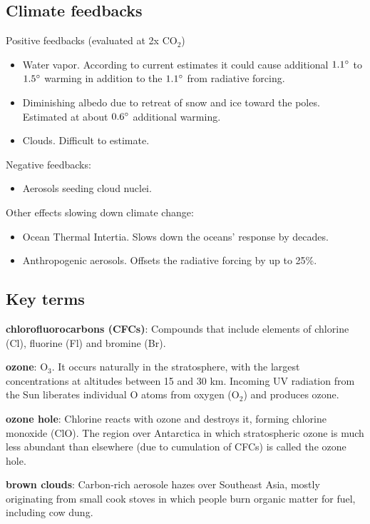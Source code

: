 \subsection{Climate feedbacks}
Positive feedbacks (evaluated at 2x CO$_2$)
\begin{itemize}
	\item Water vapor. According to current estimates it could cause
	additional $1.1 \degree$ to $1.5 \degree$ warming in addition to the
	$1.1 \degree$ from radiative forcing.
	\item Diminishing albedo due to retreat of snow and ice toward the
	poles. Estimated at about $0.6 \degree$ additional warming.
	\item Clouds. Difficult to estimate.
\end{itemize}

Negative feedbacks:
\begin{itemize}
	\item Aerosols seeding cloud nuclei.
\end{itemize}

Other effects slowing down climate change:
\begin{itemize}
	\item Ocean Thermal Intertia. Slows down the oceans' response by
	decades.
	\item Anthropogenic aerosols. Offsets the radiative forcing by up to
	25\%.
\end{itemize}

\subsection{Key terms}

\textbf{chlorofluorocarbons (CFCs)}: Compounds that include elements of
chlorine (Cl), fluorine (Fl) and bromine (Br).

\textbf{ozone}: O$_3$. It occurs naturally in the stratosphere, with the
largest concentrations at altitudes between 15 and 30 km. Incoming UV radiation
from the Sun liberates individual O atoms from oxygen (O$_2$) and produces
ozone.

\textbf{ozone hole}: Chlorine reacts with ozone and destroys it, forming
chlorine monoxide (ClO). The region over Antarctica in which stratospheric
ozone is much less abundant than elsewhere (due to cumulation of CFCs) is
called the ozone hole.

\textbf{brown clouds}: Carbon-rich aerosole hazes over Southeast Asia, mostly
originating from  small cook stoves in which people burn organic matter for
fuel, including cow dung.

